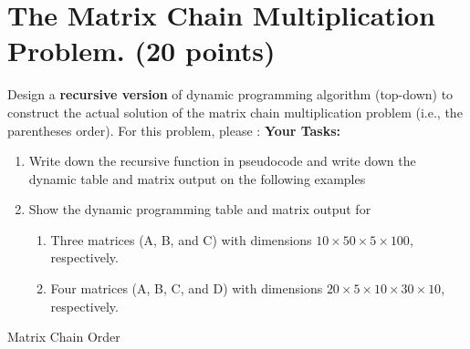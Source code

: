 \documentclass{article}[12pt]
\begin{document}
\section{The Matrix Chain Multiplication Problem. (20 points)}
Design a \textbf{recursive version} of dynamic programming algorithm (top-down) to construct the actual solution of the matrix chain multiplication problem (i.e., the parentheses order). For this problem, please :
\noindent\textbf{Your Tasks:}
\begin{enumerate}
\item Write down the recursive function in pseudocode and write down the dynamic table and matrix output on the following examples
\item Show the dynamic programming table and matrix output for 
    \begin{enumerate}
        \item  Three matrices (A, B, and C) with dimensions $10 \times 50 \times 5 \times 100$, respectively.
        \item Four matrices (A, B, C, and D) with dimensions $20 \times 5 \times 10 \times 30 \times 10$, respectively.
    \end{enumerate}

\end{enumerate}

\begin{algorithm}[H]
\caption{Matrix Chain Order}

\end{algorithm}
\end{document}
